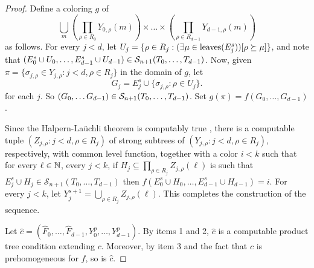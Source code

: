 \begin{proof}
Define a coloring $g$ of%
$$
		\bigcup_m  \left( \prod_{\rho \in R_0} Y_{0, \rho}(m) \right) \times \dots \times \left( \prod_{\rho \in R_{d-1}} Y_{d-1,\rho}(m) \right)
$$
as follows. For every $j < d$, let $U_j = \{\rho \in R_j: (\exists \mu \in \operatorname{leaves}(E^s_j)) [\rho \succeq \mu ] \}$, and note that $( E^s_0 \cup U_0, \dots, E^s_{d-1} \cup U_{d-1} ) \in \mathcal{S}_{n+1}({T_0, \dots, T_{d-1}})$. Now, given $\pi = \{\sigma_{j,\rho} \in Y_{j,\rho}: j < d, \rho \in R_j\}$ in the domain of $g$, let
\[
	G_j = E^s_j \cup \{\sigma_{j,\rho}: \rho \in U_j\}.
\]
for each $j$. So $( G_0, \dots G_{d-1} ) \in \mathcal{S}_{n+1}({T_0, \dots, T_{d-1}})$. Set $g(\pi) = f(G_0,\ldots,G_{d-1})$.

Since the Halpern-La\"{u}chli theorem is computably true%
, there is a computable tuple $( Z_{j,\rho}: j < d, \rho \in R_j )$ of strong subtrees of $( Y_{j,\rho}: j < d, \rho \in R_j )$, respectively, with common level function, together with a color $i < k$
such that for every $\ell \in \mathbb{N}$, every $j < k$, if $H_j \subseteq \prod_{\rho \in R_j} Z_{j,\rho}(\ell)$ is such that $E^s_j \cup H_j \in \mathcal{S}_{n+1}(T_0, \dots, T_{d-1})$ then $f( E^s_0 \cup H_0, \dots, E^s_{d-1} \cup H_{d-1} ) = i$.
For every $j < k$, let $Y^{s+1}_j = \bigcup_{\rho \in R_j} Z_{j,\rho}(\ell)$. This completes the construction of the sequence.


Let $\hat{c} = (\hat{F}_0, \dots, \hat{F}_{d-1}, Y^p_0, \dots, Y^p_{d-1})$. By items 1 and 2, 
$\hat{c}$ is a computable product tree condition extending $c$.
Moreover, by item 3 and the fact that $c$ is prehomogeneous for $f$, so is $\hat{c}$. 


\end{proof}
